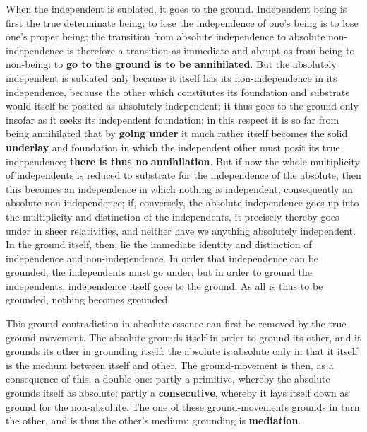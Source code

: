 \documentclass[12pt,a4paper,openany]{book}
\newcommand{\opage}[1]{\marginnote{\footnotesize\textit{[#1]}}}
\begin{document}
When the independent is sublated, it goes to the ground.
Independent being is first the true determinate being;
to lose the independence of one's being is to lose one's proper
being; the transition from absolute independence to
absolute non-independence is therefore a transition as
immediate and abrupt as from being to non-being:
to \textbf{go to the ground is to be annihilated}. But the
absolutely independent is sublated only because it
itself has its non-independence in its independence, because the other
which constitutes its foundation and substrate would itself
be posited as absolutely independent; it thus goes to the ground
only insofar as it seeks its independent foundation;
in this respect it is so far from being annihilated
that by \textbf{going under} it much rather itself becomes
the solid \textbf{underlay} and foundation in which the
independent other must posit its true independence;
\textbf{there is thus no} \textbf{annihilation}. But if now
the whole multiplicity of independents is reduced to substrate
for the independence of the absolute, then this becomes an
independence in which nothing is independent, consequently an
absolute non-independence; if, conversely, the absolute
\setcounter{footnote}{0}%
\opage{127}independence goes up into the multiplicity
and distinction of the independents, it precisely thereby goes under in sheer
relativities, and neither have we anything absolutely independent.
In the ground itself, then, lie the immediate identity and distinction of independence and
non-independence. In order that independence can be grounded, the independents
must go under; but in order to ground the independents,
independence itself goes to the ground. As
all is thus to be grounded, nothing becomes grounded.

This ground-contradiction in absolute essence can
first be removed by the true ground-movement. The absolute
grounds itself in order to ground its other, and
it grounds its other in grounding itself:
the absolute is absolute only in that it itself is the medium
between itself and other. The ground-movement is then,
as a consequence of this, a double one: partly a primitive, whereby
the absolute grounds itself as absolute; partly
a \textbf{consecutive}, whereby it lays itself down as ground for the
non-absolute. The one of these ground-movements grounds
in turn the other, and is thus the other's medium: grounding is \textbf{mediation}.
\end{document}
